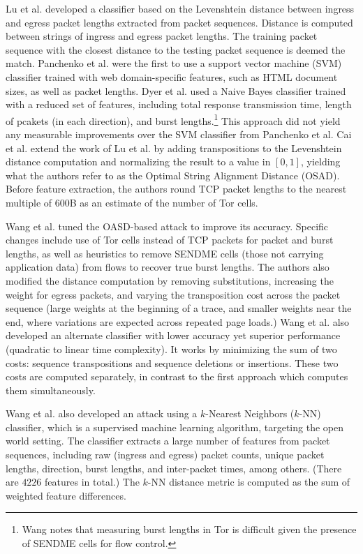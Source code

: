 \documentclass[runningheads]{llncs}
\begin{document}
Lu et al. \cite{lu2010website} developed a classifier based on the Levenshtein distance between
ingress and egress packet lengths extracted from packet sequences. Distance is computed between
strings of ingress and egress packet lengths. The training packet sequence with the closest 
distance to the testing packet sequence is deemed the match. Panchenko et al. \cite{panchenko2011website} 
were the first to use a support vector machine (SVM) classifier trained with web domain-specific
features, such as HTML document sizes, as well as packet lengths. Dyer et al. \cite{dyer2012peek}
used a Naive Bayes classifier trained with a reduced set of features, including total
response transmission time, length of pcakets (in each direction), and burst lengths.\footnote{Wang 
\cite{wang2016website} notes that measuring burst lengths in Tor is difficult given the presence of
SENDME cells for flow control.} This approach did not yield any measurable improvements over
the SVM classifier from Panchenko et al. Cai et al. \cite{cai2012touching} extend the work of Lu et al.
by adding transpositions to the Levenshtein distance computation and normalizing the result to
a value in $[0,1]$, yielding what the authors refer to as the Optimal String Alignment Distance 
(OSAD). Before feature extraction, the authors round TCP packet lengths to the nearest multiple of
$600$B as an estimate of the number of Tor cells. 

Wang et al. \cite{wang2013improved} tuned the OASD-based attack to improve its accuracy. Specific changes
include use of Tor cells instead of TCP packets for packet and burst lengths, as well as heuristics
to remove SENDME cells (those not carrying application data) from flows to recover true
burst lengths. The authors also modified the distance computation by removing substitutions,
increasing the weight for egress packets, and varying the transposition cost across the packet
sequence (large weights at the beginning of a trace, and smaller weights near the end, where
variations are expected across repeated page loads.) Wang et al. also developed an alternate classifier
with lower accuracy yet superior performance (quadratic to linear time complexity). It works by 
minimizing the sum of two costs: sequence transpositions and sequence deletions or insertions. These 
two costs are computed separately, in contrast to the first approach which computes them simultaneously.

Wang et al. \cite{wang2014effective} also developed an attack using a $k$-Nearest Neighbors ($k$-NN) classifier,
which is a supervised machine learning algorithm, targeting the open world setting. The classifier
extracts a large number of features from packet sequences, including raw (ingress and egress)
packet counts, unique packet lengths, direction, burst lengths, and inter-packet times, among others.
(There are $4226$ features in total.) The $k$-NN distance metric is computed as the sum of weighted 
feature differences. 
\end{document}
